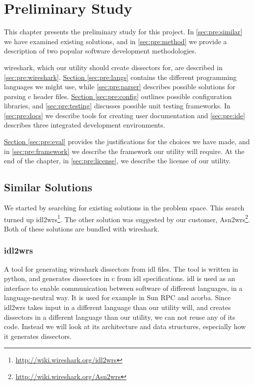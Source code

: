 \chapter{Preliminary Study}
This chapter presents the preliminary study for this project.
In \autoref{sec:pre:similar} we have examined existing solutions, and in
\autoref{sec:pre:method} we provide a description of two popular software
development methodologies.

\Gls{wireshark}, which our \gls{utility} should create \glspl{dissector} for, are described in
\autoref{sec:pre:wireshark}.
\hyperref[sec:pre:langs]{Section \ref*{sec:pre:langs}} contains the different
programming languages we might use, while \autoref{sec:pre:parser}
describes possible solutions for parsing \Gls{c} \gls{header} files.
\hyperref[sec:pre:config]{Section \ref*{sec:pre:config}} outlines possible
configuration libraries, and \autoref{sec:pre:testing} discusses possible unit
testing frameworks. In \autoref{sec:pre:docs} we describe tools for creating
user documentation and \autoref{sec:pre:ide} describes three integrated
development environments.

\hyperref[sec:pre:eval]{Section \ref*{sec:pre:eval}} provides the
justifications for the choices we have made, and in
\autoref{sec:pre:framework} we describe the framework our \gls{utility} will require.
At the end of the chapter, in \autoref{sec:pre:license}, we describe the
license of our \gls{utility}.


\section{Similar Solutions}
\label{sec:pre:similar}
We started by searching for existing solutions in the problem space. This
search turned up idl2wrs\footnote{\url{http://wiki.wireshark.org/idl2wrs}}.
The other solution was suggested by our customer,
Asn2wrs\footnote{\url{http://wiki.wireshark.org/Asn2wrs}}.
Both of these solutions are bundled with \Gls{wireshark}.

\subsection{idl2wrs}
A tool for generating \Gls{wireshark} \glspl{dissector} from \gls{idl} files. The tool is written
in \Gls{python}, and generates \glspl{dissector} in \Gls{c} from \gls{idl} specifications. \gls{idl}
 is used as an interface to enable communication between software of different languages, in a 
language-neutral way. It is used for example in \gls{Sun RPC} and \gls{acorba}. 
Since idl2wrs takes input in a different language than our \gls{utility} will, and creates \glspl{dissector}
in a different language than our \gls{utility}, we can not reuse any of its code. Instead we will look
at its architecture and data structures, especially how it generates \glspl{dissector}.

